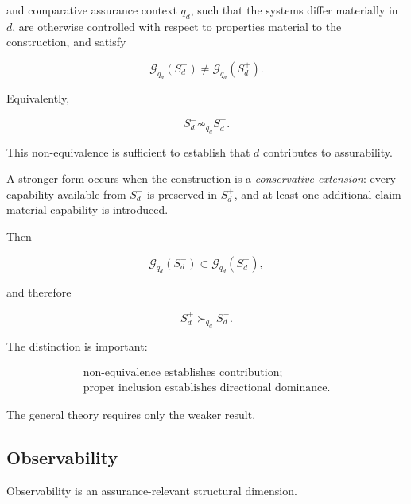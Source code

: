 and comparative assurance context \(q_d\), such that the systems differ materially in \(d\), are otherwise controlled with respect to properties material to the construction, and satisfy

\begin{equation}
  \mathcal{G}_{q_d}(S_d^{-})
  \neq
  \mathcal{G}_{q_d}(S_d^{+}).
  \label{eq:general-separation}
\end{equation}

Equivalently,

\begin{equation}
  S_d^{-}
  \not\sim_{q_d}
  S_d^{+}.
\end{equation}

This non-equivalence is sufficient to establish that \(d\) contributes to assurability.

A stronger form occurs when the construction is a \emph{conservative extension}: every capability available from \(S_d^{-}\) is preserved in \(S_d^{+}\), and at least one additional claim-material capability is introduced.

Then

\begin{equation}
  \mathcal{G}_{q_d}(S_d^{-})
  \subset
  \mathcal{G}_{q_d}(S_d^{+}),
  \label{eq:directional-separation}
\end{equation}

and therefore

\begin{equation}
  S_d^{+}
  \succ_{q_d}
  S_d^{-}.
\end{equation}

The distinction is important:

\begin{equation}
  \boxed{
    \begin{array}{c}
      \text{non-equivalence establishes contribution;}
      \\
      \text{proper inclusion establishes directional dominance.}
    \end{array}
  }
  \label{eq:separation-strength}
\end{equation}

The general theory requires only the weaker result.

\subsection{Observability}
\label{aa.subsec.observability-contribution}

\begin{proposition}
  \label{se320.prop.ObservabilityContribution}
  Observability is an assurance-relevant structural dimension.
\end{proposition}

